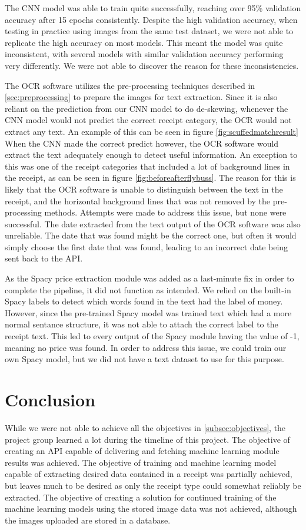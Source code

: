 The CNN model was able to train quite successfully, reaching over 95\% validation accuracy after 15 epochs consistently.
Despite the high validation accuracy, when testing in practice using images from the same test dataset, we were not able to replicate the high accuracy on most models.
This meant the model was quite inconsistent, with several models with similar validation accuracy performing very differently.
We were not able to discover the reason for these inconsistencies.

The OCR software utilizes the pre-processing techniques described in \ref{sec:preprocessing} to prepare the images for text extraction.
Since it is also reliant on the prediction from our CNN model to do de-skewing, whenever the CNN model would not predict the correct receipt category, the OCR would not extract any text.
An example of this can be seen in figure \ref{fig:scuffedmatchresult}
When the CNN made the correct predict however, the OCR software would extract the text adequately enough to detect useful information.
An exception to this was one of the receipt categories that included a lot of background lines in the receipt, as can be seen in figure \ref{fig:beforeafterflybuss}.
The reason for this is likely that the OCR software is unable to distinguish between the text in the receipt, and the horizontal background lines that was not removed by the pre-processing methods.
Attempts were made to address this issue, but none were successful.
The date extracted from the text output of the OCR software was also unreliable.
The date that was found might be the correct one, but often it would simply choose the first date that was found, leading to an incorrect date being sent back to the API.

As the Spacy price extraction module was added as a last-minute fix in order to complete the pipeline, it did not function as intended.
We relied on the built-in Spacy labels to detect which words found in the text had the label of money.
However, since the pre-trained Spacy model was trained text which had a more normal sentance structure, it was not able to attach the correct label to the receipt text.
This led to every output of the Spacy module having the value of -1, meaning no price was found.
In order to address this issue, we could train our own Spacy model, but we did not have a text dataset to use for this purpose.

\section{Conclusion}\label{sec:conclusion}
While we were not able to achieve all the objectives in \ref{subsec:objectives}, the project group learned a lot during the timeline of this project.
The objective of creating an API capable of delivering and fetching machine learning module results was achieved.
The objective of training and machine learning model capable of extracting desired data contained in a receipt was partially achieved, but leaves much to be desired as only the receipt type could somewhat reliably be extracted.
The objective of creating a solution for continued training of the machine learning models using the stored image data was not achieved, although the images uploaded are stored in a database.

